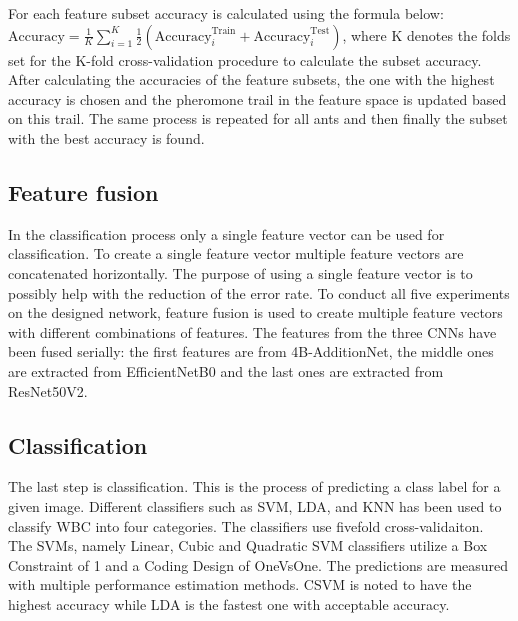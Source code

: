 For each feature subset accuracy is calculated using the formula below:
$\mathrm{Accuracy}=\frac{1}{K} \sum\limits_{i=1}^{K}\frac{1}{2}\left({\mathrm{Accuracy}}_{i}^{\mathrm{Train}}+{\mathrm{Accuracy}}_{i}^{\mathrm{Test}}\right)$,
where K denotes the folds set for the K-fold cross-validation procedure to calculate the subset accuracy.
After calculating the accuracies of the feature subsets, the one with the highest accuracy is chosen and the pheromone trail in the feature space is updated based on this trail.
The same process is repeated for all ants and then finally the subset with the best accuracy is found.

\subsection{Feature fusion}

In the classification process only a single feature vector can be used for classification. To create a single feature vector multiple feature vectors are concatenated horizontally. The purpose of using a single feature vector is to possibly help with the reduction of the error rate. To conduct all five experiments on the designed network, feature fusion is used to create multiple feature vectors with different combinations of features. The features from the three CNNs have been fused serially: the first features are from 4B-AdditionNet, the middle ones are extracted from EfficientNetB0 and the last ones are extracted from ResNet50V2.

\subsection{Classification}

The last step is classification. This is the process of predicting a class label for a given image. Different classifiers such as SVM,
LDA,
and KNN has been used to classify WBC into four categories. The classifiers use fivefold cross-validaiton. The SVMs, namely Linear, Cubic and Quadratic SVM classifiers utilize a Box Constraint of 1 and a Coding Design of OneVsOne. The predictions are measured with multiple performance estimation methods. CSVM is noted to have the highest accuracy while LDA is the fastest one with acceptable accuracy.

